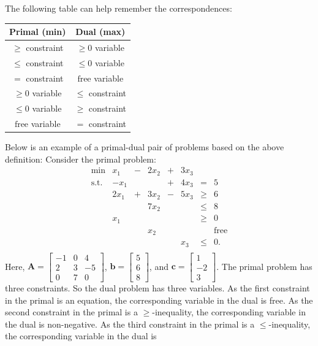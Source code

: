 The following table can help remember the correspondences:
\begin{longtable}[]{@{}cc@{}}
\toprule
Primal (min) & Dual (max)\tabularnewline
\midrule
\endhead
\(\geq\) constraint & \(\geq 0\) variable\tabularnewline
\(\leq\) constraint & \(\leq 0\) variable\tabularnewline
\(=\) constraint & \(\text{free}\) variable\tabularnewline
\(\geq 0\) variable & \(\leq\) constraint\tabularnewline
\(\leq 0\) variable & \(\geq\) constraint\tabularnewline
\(\text{free}\) variable & \(=\) constraint\tabularnewline
\bottomrule
\end{longtable}
Below is an example of a primal-dual pair of problems based on the above
definition: Consider the primal problem: \[\begin{array}{rrcrcrcl}
\mbox{min} &  x_1 & - & 2x_2 & + & 3x_3 & \\
\mbox{s.t.} & -x_1 &   &      & + & 4x_3 &  =   &5 \\
            & 2x_1 & + & 3x_2 & - & 5x_3 & \geq &  6 \\
            &      &   & 7x_2 &   &      & \leq &  8 \\
            &  x_1 &   &      &   &      & \geq &  0 \\
            &     &    & x_2  &   &      & &      \mbox{free} \\
            &     &    &      &   & x_3  & \leq & 0.\\
\end{array}\]
Here,
\(\mathbf{A}= \begin{bmatrix}  -1 & 0 & 4 \\  2 & 3 & -5 \\  0 & 7 & 0 \end{bmatrix}\),
\(\mathbf{b} = \begin{bmatrix}5 \\6\\8\end{bmatrix}\), and
\(\mathbf{c} = \begin{bmatrix}1 \\-2\\3\end{bmatrix}\).
\newl 
The primal problem has three constraints. So the dual problem has three
variables. As the first constraint in the primal is an equation, the
corresponding variable in the dual is free. As the second constraint in
the primal is a \(\geq\)-inequality, the corresponding variable in the
dual is non-negative. As the third constraint in the primal is a
\(\leq\)-inequality, the corresponding variable in the dual is
